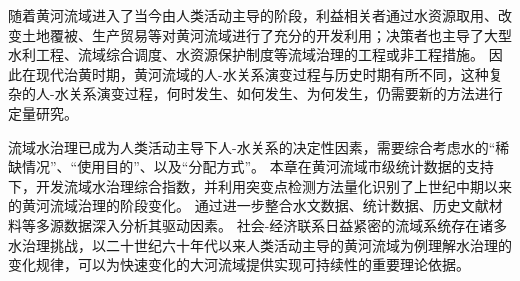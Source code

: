 随着黄河流域进入了当今由人类活动主导的阶段，利益相关者通过水资源取用、改变土地覆被、生产贸易等对黄河流域进行了充分的开发利用；决策者也主导了大型水利工程、流域综合调度、水资源保护制度等流域治理的工程或非工程措施。
因此在现代治黄时期，黄河流域的人-水关系演变过程与历史时期有所不同，这种复杂的人-水关系演变过程，何时发生、如何发生、为何发生，仍需要新的方法进行定量研究。

流域水治理已成为人类活动主导下人-水关系的决定性因素，需要综合考虑水的“稀缺情况”、“使用目的”、以及“分配方式”。
本章在黄河流域市级统计数据的支持下，开发流域水治理综合指数，并利用突变点检测方法量化识别了上世纪中期以来的黄河流域治理的阶段变化。
通过进一步整合水文数据、统计数据、历史文献材料等多源数据深入分析其驱动因素。
社会-经济联系日益紧密的流域系统存在诸多水治理挑战，以二十世纪六十年代以来人类活动主导的黄河流域为例理解水治理的变化规律，可以为快速变化的大河流域提供实现可持续性的重要理论依据。
